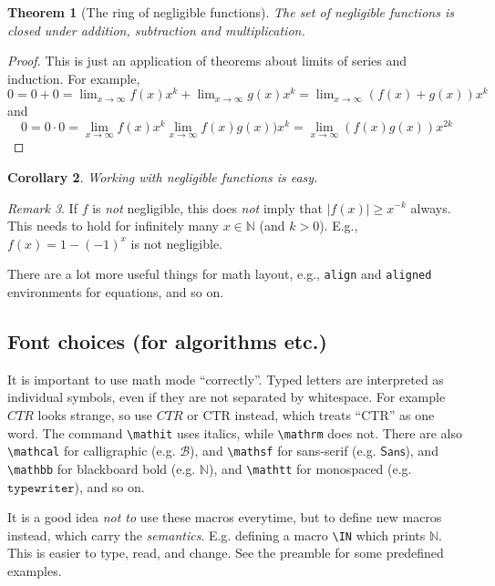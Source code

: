 \documentclass[11pt]{scrartcl}
\theoremstyle{plain} %
\newtheorem{theorem}{Theorem} %
\newtheorem{corollary}[theorem]{Corollary}
\theoremstyle{definition} %
\theoremstyle{remark} %
\newtheorem{remark}[theorem]{Remark}
\newcommand{\IN}{\mathbb{N}} %
\begin{document}
\begin{theorem}[The ring of negligible functions]
  The set of negligible functions is closed under addition, subtraction and multiplication.
\end{theorem}
\begin{proof}
  This is just an application of theorems about limits of series and induction.
  For example, $0 = 0 + 0 = \lim_{x \to \infty} f(x)x^k + \lim_{x \to \infty} g(x)x^k = \lim_{x \to \infty} (f(x) + g(x))x^k$
  and
  \begin{equation*}
    0 = 0 \cdot 0 = \lim_{x \to \infty} f(x) x^{k} \lim_{x \to \infty} f(x) g(x)) x^{k} = \lim_{x \to \infty} (f(x) g(x)) x^{2k}
  \end{equation*}
\end{proof}

\begin{corollary}
  Working with negligible functions is easy.
\end{corollary}

\begin{remark}
  If $f$ is \emph{not} negligible,
  this does \emph{not} imply that $|f(x)| \geq x^{-k}$ always.
  This needs to hold for infinitely many $x \in \IN$ (and $k > 0$).
  E.g., $f(x) = 1 - (-1)^x$ is not negligible.
\end{remark}

There are a lot more useful things for math layout,
e.g., \verb|align| and \verb|aligned| environments for equations, and so on.


\subsection{Font choices (for algorithms etc.)}
\label{subsec:font-choices}

It is important to use math mode ``correctly''.
Typed letters are interpreted as individual symbols, even if they are not separated by whitespace.
For example $CTR$ looks strange,
so use $\mathit{CTR}$ or $\mathrm{CTR}$ instead,
which treats ``CTR'' as one word.
The command \verb|\mathit| uses italics, while \verb|\mathrm| does not.
There are also \verb|\mathcal| for calligraphic (e.g. $\mathcal{B}$),
and \verb|\mathsf| for sans-serif (e.g. $\mathsf{Sans}$),
and \verb|\mathbb| for blackboard bold (e.g. $\mathbb{N}$),
and \verb|\mathtt| for monospaced (e.g. $\mathtt{typewriter}$),
and so on.

It is a good idea \emph{not to} use these macros everytime,
but to define new macros instead,
which carry the \emph{semantics}.
E.g. defining a macro \verb|\IN| which prints $\IN$.
This is easier to type, read, and change.
See the preamble for some predefined examples.
\end{document}
